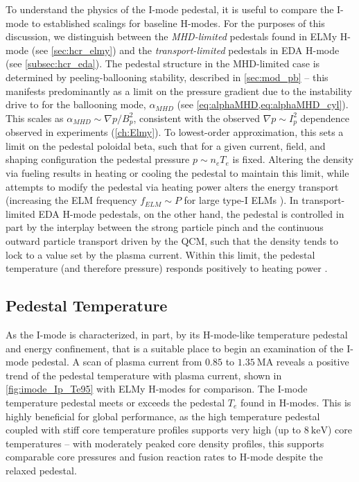 To understand the physics of the I-mode pedestal, it is useful to compare the I-mode to established scalings for baseline H-modes.  For the purposes of this discussion, we distinguish between the \emph{MHD-limited} pedestals found in ELMy H-mode (see \cref{sec:hcr_elmy}) and the \emph{transport-limited} pedestals in EDA H-mode (see \cref{subsec:hcr_eda}).  The pedestal structure in the MHD-limited case is determined by peeling-ballooning stability, described in \cref{sec:mod_pb} -- this manifests predominantly as a limit on the pressure gradient due to the instability drive to for the ballooning mode, $\alpha_{MHD}$ (see \cref{eq:alphaMHD,eq:alphaMHD_cyl}).  This scales as $\alpha_{MHD} \sim \nabla p / B_p^2$, consistent with the observed $\nabla p \sim I_p^2$ dependence observed in experiments \cite{Walk2012,Groebner2013} (\cf \cref{ch:Elmy}).  To lowest-order approximation, this sets a limit on the pedestal poloidal beta, such that for a given current, field, and shaping configuration the pedestal pressure $p \sim n_e T_e$ is fixed.  Altering the density via fueling results in heating or cooling the pedestal to maintain this limit, while attempts to modify the pedestal via heating power alters the energy transport (increasing the ELM frequency $f_{ELM} \sim P$ for large type-I ELMs \cite{Urano2003}).  In transport-limited EDA H-mode pedestals, on the other hand, the pedestal is controlled in part by the interplay between the strong particle pinch and the continuous outward particle transport driven by the QCM, such that the density tends to lock to a value set by the plasma current.  Within this limit, the pedestal temperature (and therefore pressure) responds positively to heating power \cite{Hubbard2001}.

\subsection{Pedestal Temperature}\label{subsec:imode_temp}

As the I-mode is characterized, in part, by its H-mode-like temperature pedestal and energy confinement, that is a suitable place to begin an examination of the I-mode pedestal.  A scan of plasma current from $\num{0.85}$ to $\SI{1.35}{\mega\ampere}$ reveals a positive trend of the pedestal temperature with plasma current, shown in \cref{fig:imode_Ip_Te95} with ELMy H-modes for comparison.  The I-mode temperature pedestal meets or exceeds the pedestal $T_e$ found in H-modes.  This is highly beneficial for global performance, as the high temperature pedestal coupled with stiff core temperature profiles supports very high (up to $\SI{8}{\kilo\electronvolt}$) core temperatures -- with moderately peaked core density profiles, this supports comparable core pressures and fusion reaction rates to H-mode despite the relaxed pedestal.

